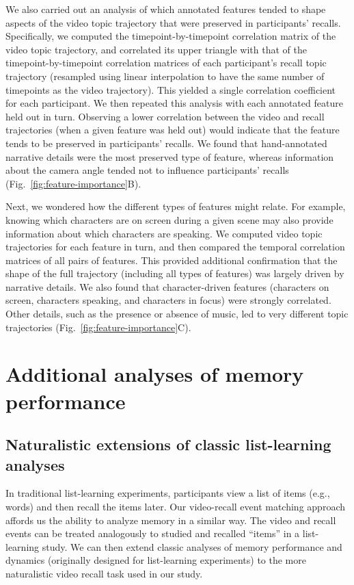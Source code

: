 \documentclass{article}
\begin{document}
We also carried out an analysis of which annotated features tended to shape aspects of the video topic trajectory that were preserved in participants' recalls.  Specifically, we computed the timepoint-by-timepoint correlation matrix of the video topic trajectory, and correlated its upper triangle with that of the timepoint-by-timepoint correlation matrices of each participant's recall topic trajectory (resampled using linear interpolation to have the same number of timepoints as the video trajectory).  This yielded a single correlation coefficient for each participant.  We then repeated this analysis with each annotated feature held out in turn.  Observing a lower correlation between the video and recall trajectories (when a given feature was held out) would indicate that the feature tends to be preserved in participants' recalls.  We found that hand-annotated narrative details were the most preserved type of feature, whereas information about the camera angle tended not to influence participants' recalls (Fig.~\ref{fig:feature-importance}B).

Next, we wondered how the different types of features might relate.  For example, knowing which characters are on screen during a given scene may also provide information about which characters are speaking.  We computed video topic trajectories for each feature in turn, and then compared the temporal correlation matrices of all pairs of features.  This provided additional confirmation that the shape of the full trajectory (including all types of features) was largely driven by narrative details.  We also found that character-driven features (characters on screen, characters speaking, and characters in focus) were strongly correlated.  Other details, such as the presence or absence of music, led to very different topic trajectories (Fig.~\ref{fig:feature-importance}C).


\section*{Additional analyses of memory performance}

\subsection*{Naturalistic extensions of classic list-learning analyses}
In traditional list-learning experiments, participants view a list of items (e.g., words) and then recall the items later.  Our video-recall event matching approach affords us the ability to analyze memory in a similar way. The video and recall events can be treated analogously to studied and recalled ``items'' in a list-learning study.  We can then extend classic analyses of memory performance and dynamics (originally designed for list-learning experiments) to the more naturalistic video recall task used in our study.
\end{document}
